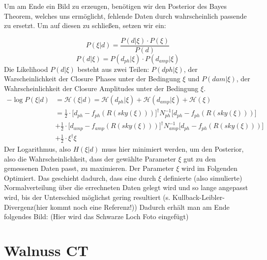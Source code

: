 \documentclass[]{dsadokumentation}
\begin{document}
Um am Ende ein Bild zu erzeugen, benötigen wir den Posterior des Bayes Theorem, welches uns ermöglicht, fehlende Daten durch wahrscheinlich passende zu ersetzt. Um auf diesen zu schließen, setzen wir ein:

\begin{displaymath}
P(\xi|d)= \frac {P(d|\xi)\cdot P(\xi)}{ P(d) }
\end{displaymath}
\begin{displaymath}
P(d|\xi)=  {P(d_{ph}|\xi)\cdot P(d_{amp}|\xi)}
\end{displaymath}
Die Likelihood $P(d|\xi)$ besteht aus zwei Teilen: $P(dph|\xi)$, der Warscheinlichkeit der Closure Phases unter der Bedingung $\xi$ und $P(dam| \xi)$, der Wahrscheinlichkeit der Closure Amplitudes unter der Bedingung $\xi$.
\begin{align}
 -\log {P(\xi|d)} &=
 \mathcal{H} (\xi|d) = \mathcal{H} (d_{ph}|\xi)+\mathcal{H} (d_{amp}|\xi)+\mathcal{H} (\xi) \\
&= \frac {1}{2}\cdot \Bigg[d_{ph} - f_{ph}(R(sky(\xi))) \Bigg]^\dagger N^{-1}_{ph} \Bigg[d_{ph} - f_{ph}(R(sky(\xi))) \Bigg]  
\\  & + \frac {1}{2}\cdot \Bigg[d_{amp} - f_{amp}(R(sky(\xi))) \Bigg]^\dagger N_{amp}^{-1}\Bigg[d_{ph} - f_{ph}(R(sky(\xi))) \Bigg]
\\ & +  \frac {1}{2} \cdot \xi^\dagger \xi
\end{align}
Der Logarithmus, also $H(\xi|d)$ muss hier minimiert werden, um den Posterior, also die Wahrscheinlichkeit, dass der gewählte Parameter $\xi$ gut zu den gemessenen Daten passt, zu maximieren.
Der Parameter $\xi$ wird im Folgenden Optimiert. Das geschieht dadurch, dass eine durch $\xi$ definierte (also simulierte) Normalverteilung über die errechneten Daten gelegt wird und so lange angepasst wird, bis der Unterschied möglichst gering resultiert (s. Kullback-Leibler-Divergenz(hier kommt noch eine Referenz!)) %
Dadurch erhält man am Ende folgendes Bild:
(Hier wird das Schwarze Loch Foto eingefügt)



\section{Walnuss CT}\label{k4.2.ch.walnussct}
\end{document}
